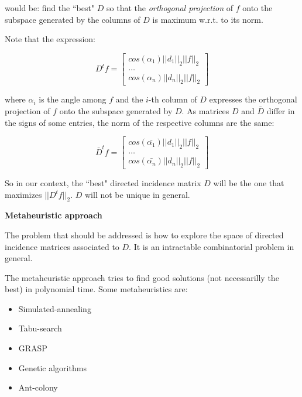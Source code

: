 \documentclass[a4paper,11pt]{article}
\begin{document}
\bigskip

would be: find the ``best" $D$ so that the \textit{orthogonal 
projection} of $f$ onto the subspace generated by the columns of $D$ is 
maximum w.r.t. to its norm. 

\bigskip

Note that the expression:

\begin{equation}
     D^t f = \begin{bmatrix}
         cos(\alpha_1) ||d_1||_2 ||f||_2\\
         \dots \\
         cos(\alpha_n) ||d_n||_2 ||f||_2
	\end{bmatrix}
\end{equation}

where $\alpha_i$ is the angle among $f$ and the $i$-th column of $D$ 
expresses the orthogonal projection of $f$ onto the subspace generated 
by $D$. As matrices $D$ and $\bar{D}$ differ in the signs of some 
entries, the norm of the respective columns are the same:

\begin{equation}
     \bar{D}^t f = \begin{bmatrix}
         cos(\bar{\alpha_1}) ||d_1||_2 ||f||_2\\
         \dots \\
         cos(\bar{\alpha_n}) ||d_n||_2 ||f||_2
	\end{bmatrix}
\end{equation}

So in our context, the ``best" directed incidence matrix $D$ will be the 
one that maximizes $||D^t f||_2$. $D$ will not be unique in general.

\bigskip

\textbf{Metaheuristic approach}

\bigskip

The problem that should be addressed is how to explore the space of 
directed incidence matrices associated to $D$. It is an intractable 
combinatorial problem in general. 

\bigskip

The metaheuristic approach tries to find good solutions (not 
necessarilly the best) in polynomial time. Some metaheuristics are:

\begin{itemize}
	\item Simulated-annealing
	\item Tabu-search
	\item GRASP
	\item Genetic algorithms
	\item Ant-colony
\end{itemize}
\end{document}
